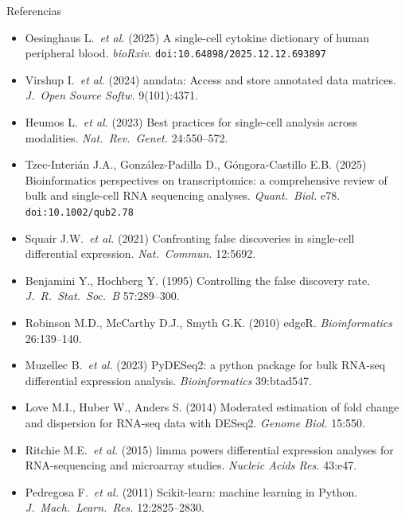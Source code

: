 \documentclass[aspectratio=169,10pt]{beamer}
\begin{document}
\appendix
\begin{frame}{Referencias}
  \scriptsize
  \begin{itemize}\setlength\itemsep{3pt}
    \item Oesinghaus L.\ \emph{et al.} (2025) A single-cell cytokine dictionary of human peripheral blood. \emph{bioRxiv}. \texttt{doi:10.64898/2025.12.12.693897}
    \item Virshup I.\ \emph{et al.} (2024) anndata: Access and store annotated data matrices. \emph{J.\ Open Source Softw.} 9(101):4371.
    \item Heumos L.\ \emph{et al.} (2023) Best practices for single-cell analysis across modalities. \emph{Nat.\ Rev.\ Genet.} 24:550--572.
    \item Tzec-Interi\'an J.A., Gonz\'alez-Padilla D., G\'ongora-Castillo E.B. (2025) Bioinformatics perspectives on transcriptomics: a comprehensive review of bulk and single-cell RNA sequencing analyses. \emph{Quant.\ Biol.} e78. \texttt{doi:10.1002/qub2.78}
    \item Squair J.W.\ \emph{et al.} (2021) Confronting false discoveries in single-cell differential expression. \emph{Nat.\ Commun.} 12:5692.
    \item Benjamini Y., Hochberg Y. (1995) Controlling the false discovery rate. \emph{J.\ R.\ Stat.\ Soc.\ B} 57:289--300.
    \item Robinson M.D., McCarthy D.J., Smyth G.K. (2010) edgeR. \emph{Bioinformatics} 26:139--140.
    \item Muzellec B.\ \emph{et al.} (2023) PyDESeq2: a python package for bulk RNA-seq differential expression analysis. \emph{Bioinformatics} 39:btad547.
    \item Love M.I., Huber W., Anders S. (2014) Moderated estimation of fold change and dispersion for RNA-seq data with DESeq2. \emph{Genome Biol.} 15:550.
    \item Ritchie M.E.\ \emph{et al.} (2015) limma powers differential expression analyses for RNA-sequencing and microarray studies. \emph{Nucleic Acids Res.} 43:e47.
    \item Pedregosa F.\ \emph{et al.} (2011) Scikit-learn: machine learning in Python. \emph{J.\ Mach.\ Learn.\ Res.} 12:2825--2830.
  \end{itemize}
\end{frame}
\end{document}
